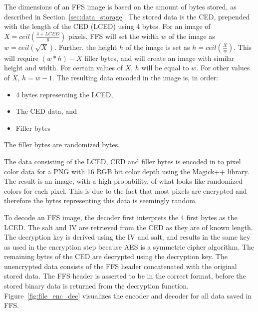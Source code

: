 The dimensions of an FFS image is based on the amount of bytes stored, as described in Section~\ref{sec:data_storage}. The stored data is the CED, prepended with the length of the CED (\gls{LCED}) using 4 bytes. For an image of $X = ceil(\frac{4 + LCED}{6})$ pixels, FFS will set the width $w$ of the image as $w = ceil(\sqrt{X})$. Further, the height $h$ of the image is set as $h = ceil(\frac{X}{w})$. This will require $(w * h) - X$ filler bytes, and will create an image with similar height and width. For certain values of $X$, $h$ will be equal to $w$. For other values of $X$, $h = w-1$. The resulting data encoded in the image is, in order:
\begin{itemize}
	\item 4 bytes representing the LCED,
	\item The CED data, and
	\item Filler bytes
\end{itemize}
The filler bytes are randomized bytes.

The data consisting of the LCED, CED and filler bytes is encoded in to pixel color data for a PNG with 16 RGB bit color depth using the Magick++ library. The result is an image, with a high probability, of what looks like randomized colors for each pixel. This is due to the fact that most pixels are encrypted and therefore the bytes representing this data is seemingly random.

To decode an FFS image, the decoder first interprets the 4 first bytes as the LCED. The salt and IV are retrieved from the CED as they are of known length. The decryption key is derived using the IV and salt, and results in the same key as used in the encryption step because AES is a symmetric cipher algorithm. The remaining bytes of the CED are decrypted using the decryption key. The unencrypted data consists of the FFS header concatenated with the original stored data. The FFS header is asserted to be in the correct format, before the stored binary data is returned from the decryption function. Figure~\ref{fig:file_enc_dec} visualizes the encoder and decoder for all data saved in FFS.

